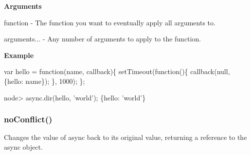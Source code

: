 {\bfseries Arguments}


\begin{DoxyItemize}
\item function -\/ The function you want to eventually apply all arguments to.
\item arguments... -\/ Any number of arguments to apply to the function.
\end{DoxyItemize}

{\bfseries Example}


\begin{DoxyCode}
var hello = \textcolor{keyword}{function}(name, callback)\{
    setTimeout(\textcolor{keyword}{function}()\{
        callback(null, \{hello: name\});
    \}, 1000);
\};
\end{DoxyCode}
 
\begin{DoxyCode}
node> async.dir(hello, \textcolor{stringliteral}{'world'});
\{hello: \textcolor{stringliteral}{'world'}\}
\end{DoxyCode}
 



\label{_noConflict}%
 \subsubsection*{no\+Conflict()}

Changes the value of async back to its original value, returning a reference to the async object. 
